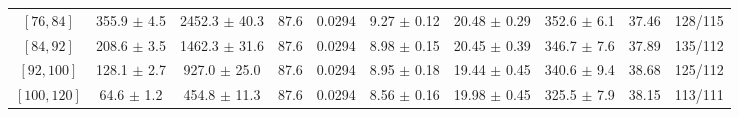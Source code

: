 \begin{tabular}{c||c|c|c|c|c|c|c||c|c}
$[76, 84]$ & 355.9 $\pm$ 4.5 & 2452.3 $\pm$ 40.3 & 87.6 & 0.0294 & 9.27 $\pm$ 0.12 & 20.48 $\pm$ 0.29 & 352.6 $\pm$ 6.1 & 37.46 & 128/115\\
$[84, 92]$ & 208.6 $\pm$ 3.5 & 1462.3 $\pm$ 31.6 & 87.6 & 0.0294 & 8.98 $\pm$ 0.15 & 20.45 $\pm$ 0.39 & 346.7 $\pm$ 7.6 & 37.89 & 135/112\\
$[92, 100]$ & 128.1 $\pm$ 2.7 & 927.0 $\pm$ 25.0 & 87.6 & 0.0294 & 8.95 $\pm$ 0.18 & 19.44 $\pm$ 0.45 & 340.6 $\pm$ 9.4 & 38.68 & 125/112\\
$[100, 120]$ & 64.6 $\pm$ 1.2 & 454.8 $\pm$ 11.3 & 87.6 & 0.0294 & 8.56 $\pm$ 0.16 & 19.98 $\pm$ 0.45 & 325.5 $\pm$ 7.9 & 38.15 & 113/111\\
\end{tabular}
